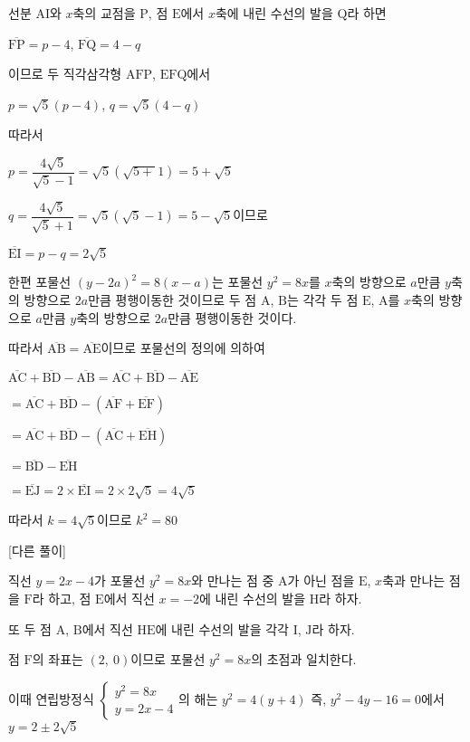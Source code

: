 \documentclass{oblivoir}
\begin{document}
선분 $\mathrm{AI}$와 $x$축의 교점을 $\mathrm{P}$, 점 $\mathrm{E}$에서 $x$축에 내린 수선의 발을 $\mathrm{Q}$라 하면 

$\overline{\mathrm{FP}} = p-4$, $\overline{\mathrm{FQ}} = 4- q$

이므로 두 직각삼각형 $\mathrm{AFP}$, $\mathrm{EFQ}$에서 

$p=\sqrt{5}(p-4)$, $q=\sqrt{5}(4-q)$

따라서

$p=\dfrac{4\sqrt{5}}{\sqrt{5}-1}=\sqrt{5}(\sqrt{5+}1)=5+\sqrt{5}$

$q=\dfrac{4\sqrt{5}}{\sqrt{5}+1}=\sqrt{5}(\sqrt{5}-1)=5-\sqrt{5}$이므로

$\overline{\mathrm{EI}} = p- q = 2\sqrt{5}$

한편 포물선 $(y-2a)^{2}= 8(x- a)$는 포물선 $y^{2}= 8x$를 $x$축의 방향으로 $a$만큼 $y$축의 방향으로 $2a$만큼 평행이동한 것이므로 두 점 $\mathrm{A}$, $\mathrm{B}$는 각각 두 점 $\mathrm{E}$, $\mathrm{A}$를 $x$축의 방향으로 $a$만큼 $y$축의 방향으로 $2a$만큼 평행이동한 것이다. 

따라서 $\overline{\mathrm{AB}} =\overline{\mathrm{AE}}$이므로 포물선의 정의에 의하여 

$\overline{\mathrm{AC}}+\overline{\mathrm{BD}}-\overline{\mathrm{AB}}$$=\overline{\mathrm{AC}} +\overline{\mathrm{BD}} -\overline{\mathrm{AE}}$

$=\overline{\mathrm{AC}} +\overline{\mathrm{BD}} -(\overline{\mathrm{AF}} +\overline{\mathrm{EF}})$

$=\overline{\mathrm{AC}} +\overline{\mathrm{BD}} -(\overline{\mathrm{AC}} +\overline{\mathrm{EH}})$

$=\overline{\mathrm{BD}} -\overline{\mathrm{EH}}$

$=\overline{\mathrm{EJ}}$$= 2\times\overline{\mathrm{EI}}$$= 2\times 2\sqrt{5}= 4\sqrt{5}$

따라서 $k = 4\sqrt{5}$이므로 $k^{2}= 80$

[다른 풀이]

직선 $y = 2x - 4$가 포물선 $y^{2}= 8x$와 만나는 점 중 $\mathrm{A}$가 아닌 점을 $\mathrm{E}$, $x$축과 만나는 점을 $\mathrm{F}$라 하고, 점 $\mathrm{E}$에서 직선 $x = -2$에 내린 수선의 발을 $\mathrm{H}$라 하자.

또 두 점 $\mathrm{A}$, $\mathrm{B}$에서 직선 $\mathrm{HE}$에 내린 수선의 발을 각각 $\mathrm{I}$, $\mathrm{J}$라 하자.

점  $\mathrm{F}$의 좌표는 $(2,\:0)$이므로 포물선 $y^{2}= 8x$의 초점과 일치한다. 

이때 연립방정식 $\begin{cases}
y^{2}=8x\\
y=2x-4
\end{cases}$의 해는 $y^{2}= 4(y+ 4)$ 즉, $y^{2}- 4y - 16 = 0$에서 $y=2\pm 2\sqrt{5}$
\end{document}

